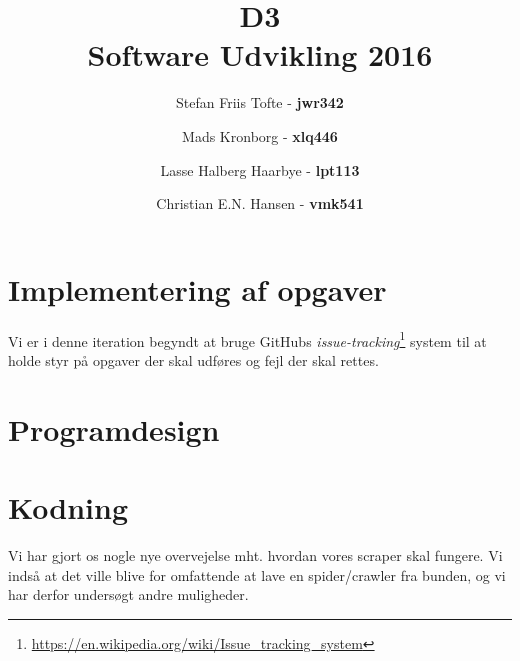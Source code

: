 \documentclass[11pt]{article}
\title{
  \vspace{3cm}
  \Huge{D3} \\
  \Large{Software Udvikling 2016}
}
\author{
	\Large{Stefan Friis Tofte} - \textbf{jwr342}%
	\and
	\Large{Mads Kronborg} - \textbf{xlq446}%
	\and
	\Large{Lasse Halberg Haarbye} - \textbf{lpt113}%
	\and
	\Large{Christian E.N. Hansen} - \textbf{vmk541}%
}
\def \ColourPDF {../include/ku-farve}
\def \TitlePDF {../include/ku-en}  %
\begin{document}


\clearpage\maketitle
\thispagestyle{empty}

\newpage
\tableofcontents
\newpage

\section{Implementering af opgaver}
Vi er i denne iteration begyndt at bruge GitHubs \textit{issue-tracking}\footnote{\url{https://en.wikipedia.org/wiki/Issue_tracking_system}} system til at holde styr på opgaver der skal udføres og fejl der skal rettes.


\section{Programdesign}

\section{Kodning}
Vi har gjort os nogle nye overvejelse mht. hvordan vores scraper skal fungere. Vi indså at det ville blive for omfattende at lave en spider/crawler fra bunden, og vi har derfor undersøgt andre muligheder.
\end{document}
